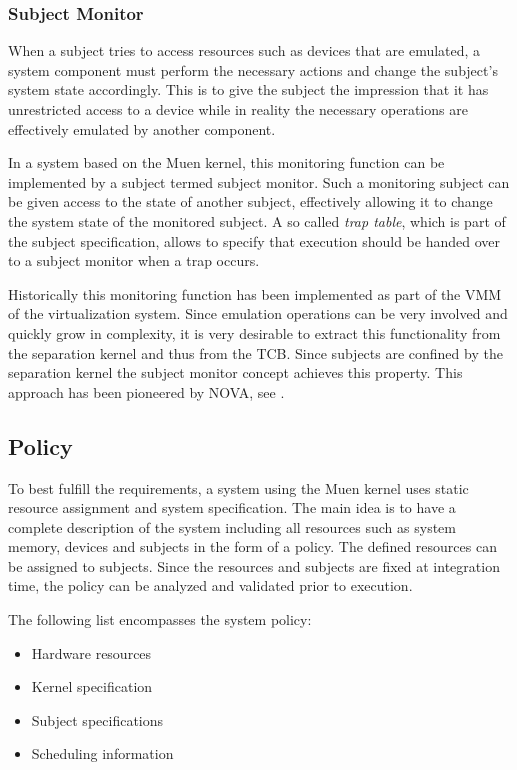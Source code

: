 \subsubsection{Subject Monitor}
When a subject tries to access resources such as devices that are emulated, a
system component must perform the necessary actions and change the subject's
system state accordingly. This is to give the subject the impression that it
has unrestricted access to a device while in reality the necessary operations
are effectively emulated by another component.

In a system based on the Muen kernel, this monitoring function can be
implemented by a subject termed subject monitor. Such a monitoring subject can
be given access to the state of another subject, effectively allowing it to
change the system state of the monitored subject. A so called \emph{trap table},
which is part of the subject specification, allows to specify that execution
should be handed over to a subject monitor when a trap occurs.

Historically this monitoring function has been implemented as part of the VMM
of the virtualization system. Since emulation operations can be very involved
and quickly grow in complexity, it is very desirable to extract this
functionality from the separation kernel and thus from the TCB. Since subjects
are confined by the separation kernel the subject monitor concept achieves this
property. This approach has been pioneered by NOVA, see
\cite{Steinberg:2010:NMS:1755913.1755935}.

\subsection{Policy}\label{subsec:policy}
To best fulfill the requirements, a system using the Muen kernel uses static
resource assignment and system specification. The main idea is to have a
complete description of the system including all resources such as system
memory, devices and subjects in the form of a policy. The defined resources can
be assigned to subjects. Since the resources and subjects are fixed at
integration time, the policy can be analyzed and validated prior to execution.

The following list encompasses the system policy:
\begin{itemize}
	\item Hardware resources
	\item Kernel specification
	\item Subject specifications
	\item Scheduling information
\end{itemize}

